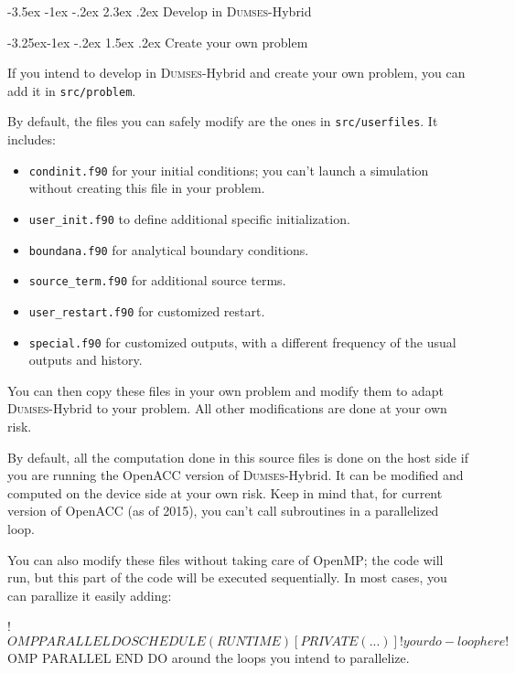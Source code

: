 \documentclass[a4paper,12pt]{article}
\makeatletter
\newenvironment{codeblock}[2][]{%
    \minted[bgcolor=LightGray!80!white,fontsize=\small,#1]{#2}%
}{%
    \endminted%
}%
\newenvironment{codeblock}[2][]{\small\verbatim}{\endverbatim}
\renewcommand{\section}{\clearpage\@startsection {section}{1}{\z@}%
             {-3.5ex \@plus -1ex \@minus -.2ex}%
             {2.3ex \@plus .2ex}%
             {\normalfont\Large\sffamily\bfseries}}
\renewcommand{\subsection}{\@startsection{subsection}{2}{\z@}%
             {-3.25ex\@plus -1ex \@minus -.2ex}%
             {1.5ex \@plus .2ex}%
             {\normalfont\large\sffamily\bfseries}}
\makeatother
\begin{document}
\section{Develop in \textsc{Dumses}-Hybrid}

\subsection{Create your own problem}

If you intend to develop in \textsc{Dumses}-Hybrid and create your own problem, you can add it in \texttt{src/problem}.

By default, the files you can safely modify are the ones in \texttt{src/userfiles}. It includes:
\begin{itemize}
  \item \texttt{condinit.f90} for your initial conditions; you can't launch a simulation without creating this file in your problem.
  \item \texttt{user\_init.f90} to define additional specific initialization.
  \item \texttt{boundana.f90} for analytical boundary conditions.
  \item \texttt{source\_term.f90} for additional source terms.
  \item \texttt{user\_restart.f90} for customized restart.
  \item \texttt{special.f90} for customized outputs, with a different frequency of the usual outputs and history.
\end{itemize}

You can then copy these files in your own problem and modify them to adapt \textsc{Dumses}-Hybrid to your problem. All other modifications are done at your own risk.

By default, all the computation done in this source files is done on the host side if you are running the OpenACC version of \textsc{Dumses}-Hybrid. It can be modified and computed on the device side at your own risk. Keep in mind that, for current version of OpenACC (as of 2015), you can't call subroutines in a parallelized loop.

You can also modify these files without taking care of OpenMP; the code will run, but this part of the code will be executed sequentially. In most cases, you can parallize it easily adding:

\begin{codeblock}{fortran}
  !$OMP PARALLEL DO SCHEDULE(RUNTIME) [PRIVATE(...)]
  ! your do-loop here
  !$OMP PARALLEL END DO
\end{codeblock}
around the loops you intend to parallelize.
\end{document}
